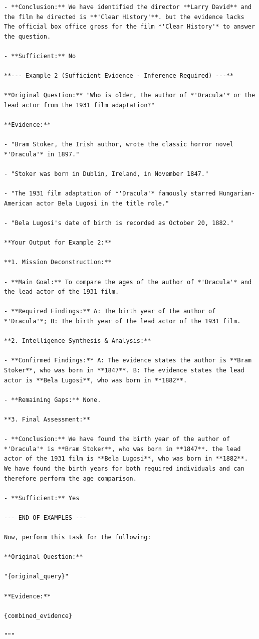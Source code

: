 \documentclass[11pt]{article}
\begin{document}
\begin{lstlisting}[basicstyle=\scriptsize\ttfamily]
- **Conclusion:** We have identified the director **Larry David** and the film he directed is **'Clear History'**. but the evidence lacks The official box office gross for the film *'Clear History'* to answer the question.

- **Sufficient:** No

**--- Example 2 (Sufficient Evidence - Inference Required) ---**

**Original Question:** "Who is older, the author of *'Dracula'* or the lead actor from the 1931 film adaptation?"

**Evidence:**

- "Bram Stoker, the Irish author, wrote the classic horror novel *'Dracula'* in 1897."

- "Stoker was born in Dublin, Ireland, in November 1847."

- "The 1931 film adaptation of *'Dracula'* famously starred Hungarian-American actor Bela Lugosi in the title role."

- "Bela Lugosi's date of birth is recorded as October 20, 1882."

**Your Output for Example 2:**

**1. Mission Deconstruction:**

- **Main Goal:** To compare the ages of the author of *'Dracula'* and the lead actor of the 1931 film.

- **Required Findings:** A: The birth year of the author of *'Dracula'*; B: The birth year of the lead actor of the 1931 film.

**2. Intelligence Synthesis & Analysis:**

- **Confirmed Findings:** A: The evidence states the author is **Bram Stoker**, who was born in **1847**. B: The evidence states the lead actor is **Bela Lugosi**, who was born in **1882**.

- **Remaining Gaps:** None.

**3. Final Assessment:**

- **Conclusion:** We have found the birth year of the author of *'Dracula'* is **Bram Stoker**, who was born in **1847**. the lead actor of the 1931 film is **Bela Lugosi**, who was born in **1882**. We have found the birth years for both required individuals and can therefore perform the age comparison.

- **Sufficient:** Yes

--- END OF EXAMPLES ---

Now, perform this task for the following:

**Original Question:**

"{original_query}"

**Evidence:**

{combined_evidence}

"""
\end{lstlisting}
\end{document}

